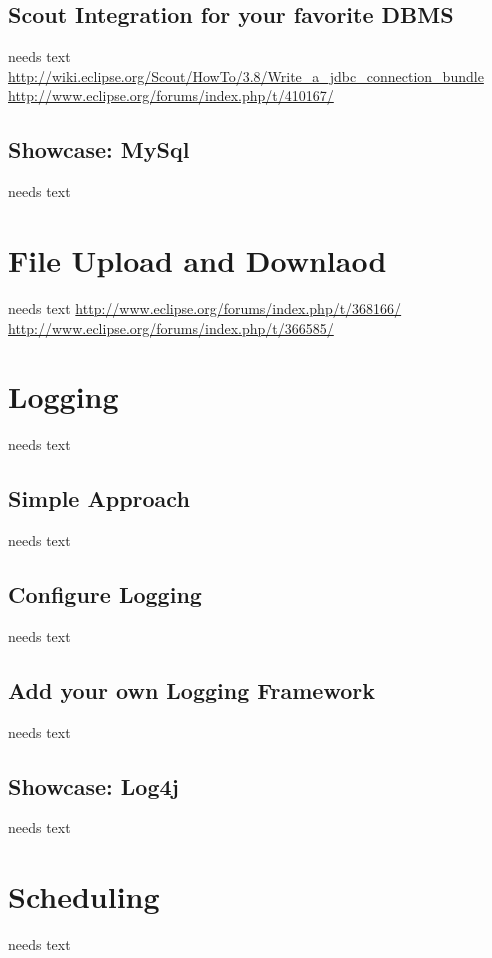 \documentclass[a4paper,10pt,twoside]{book}
\begin{document}
\subsection{Scout Integration for your favorite DBMS}
needs text
\url{http://wiki.eclipse.org/Scout/HowTo/3.8/Write_a_jdbc_connection_bundle}
\url{http://www.eclipse.org/forums/index.php/t/410167/}

\subsection{Showcase: MySql}
needs text
  
\section{File Upload and Downlaod}
needs text
\url{http://www.eclipse.org/forums/index.php/t/368166/}
\url{http://www.eclipse.org/forums/index.php/t/366585/}
  
\section{Logging}
needs text

\subsection{Simple Approach}
needs text
  
\subsection{Configure Logging}
needs text
  
\subsection{Add your own Logging Framework}
needs text
  
\subsection{Showcase: Log4j}
needs text
    
\section{Scheduling}
needs text
\end{document}
